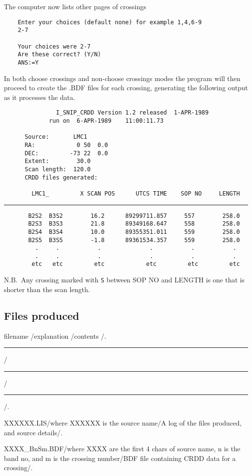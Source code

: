 The computer now lists other pages of crossings

\begin{verbatim}
    Enter your choices (default none) for example 1,4,6-9
    2-7

    Your choices were 2-7
    Are these correct? (Y/N)
    ANS:=Y
\end{verbatim}
In both choose crossings and non-choose crossings modes the program will then
proceed to create the .BDF files for each crossing, generating the following
output as it processes the data.

\pagebreak
\begin{verbatim}
               I_SNIP_CRDD Version 1.2 released  1-APR-1989
             run on  6-APR-1989    11:00:11.73

      Source:       LMC1
      RA:            0 50  0.0
      DEC:         -73 22  0.0
      Extent:        30.0
      Scan length:  120.0
      CRDD files generated:

        LMC1_         X SCAN POS      UTCS TIME    SOP NO     LENGTH
\end{verbatim}
\hrule
\begin{verbatim}
       B2S2  B3S2        16.2      89299711.857     557        258.0
       B2S3  B3S3        21.8      89349168.647     558        258.0
       B2S4  B3S4        10.0      89355351.011     559        258.0
       B2S5  B3S5        -1.8      89361534.357     559        258.0
         .     .           .              .           .           .
         .     .           .              .           .           .
        etc   etc         etc            etc         etc         etc
\end{verbatim}

N.B.\ Any crossing marked with {\tt S} between SOP NO and LENGTH is one that
is shorter than the scan length.

\subsection {Files produced}

\tfile\hfill filename \hfill/\hfill explanation \hfill/\hfill contents \hfill/.

\tfile \hrule/\hrule/\hrule/.

\tfile XXXXXX.LIS/where XXXXXX is the source name/A log of the files
produced, and source details/.

\tfile XXXX\_BnSm.BDF/where XXXX are the first 4 chars of source name,
n is the band no, and m is the crossing number/BDF file containing
CRDD data for a crossing/.

